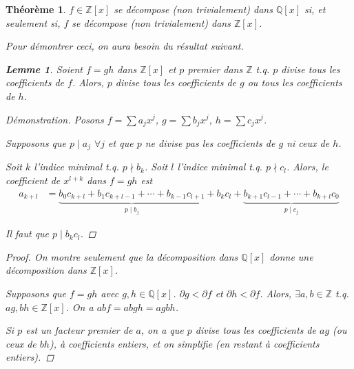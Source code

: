 \documentclass{report}
\newtheorem*{thm}{Th\'eor\`eme}
\newtheorem*{lem}{Lemme}
\theoremstyle{definition}
\theoremstyle{remark}
\newenvironment*{subproof}[1][D\'emonstration]
{
\begin{proof}[#1]

}
{
\renewcommand{\qedsymbol}{$\blacksquare$}
\end{proof}
\renewcommand{\qedsymbol}{$\square$}
}
\def\ZZ{\mathbb{Z}}
\def\QQ{\mathbb{Q}}
\begin{document}
	\begin{thm}
		$f\in\ZZ[x]$ se d\'ecompose (non trivialement) dans $\QQ[x]$ si, et seulement si, $f$ se d\'ecompose (non trivialement) dans $\ZZ[x]$.

		Pour d\'emontrer ceci, on aura besoin du r\'esultat suivant.
		\begin{lem}
			Soient $f=gh$ dans $\ZZ[x]$ et $p$ premier dans $\ZZ$ t.q. $p$ divise tous les coefficients de $f$. Alors, $p$ divise tous les coefficients de $g$ ou tous les coefficients de $h$.

			\begin{subproof}
				Posons $f=\sum a_jx^j$, $g=\sum b_jx^j$, $h=\sum c_jx^j$.

				Supposons que $p\mid a_j$ $\forall j$ et que $p$ ne divise pas les coefficients de $g$ ni ceux de $h$.

				Soit $k$ l'indice minimal t.q. $p\nmid b_k$. Soit $l$ l'indice minimal t.q. $p\nmid c_l$. Alors, le coefficient de $x^{l+k}$ dans $f=gh$ est
				\begin{align*}
					a_{k+l}&= \underbrace{b_0c_{k+l} + b_1c_{k+l-1} + \cdots + b_{k-1}c_{l+1}}_{p\mid b_j} + b_kc_l + \underbrace{b_{k+1}c_{l-1} + \cdots + b_{k+l}c_0}_{p\mid c_j}
				\end{align*}

				Il faut que $p\mid b_kc_l$. \lightning
			\end{subproof}
		\end{lem}

		\begin{proof}
			On montre seulement que la d\'ecomposition dans $\QQ[x]$ donne une d\'ecomposition dans $\ZZ[x]$.

			Supposons que $f=gh$ avec $g,h\in\QQ[x]$. $\partial g<\partial f$ et $\partial h<\partial f$. Alors, $\exists a,b\in\ZZ$ t.q. $ag,bh\in\ZZ[x]$. On a $abf = abgh = agbh$.

			Si $p$ est un facteur premier de $a$, on a que $p$ divise tous les coefficients de $ag$ (ou ceux de $bh$), \`a coefficients entiers, et on simplifie (en restant \`a coefficients entiers).
		\end{proof}
	\end{thm}
\end{document}
